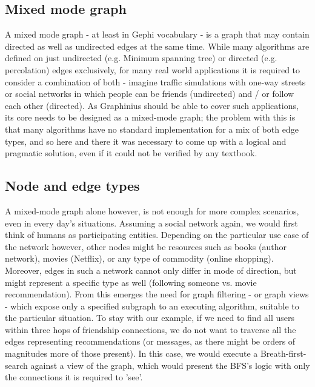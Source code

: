 	\subsection{Mixed mode graph}
	\label{ssect:mixedmode}
	A mixed mode graph - at least in Gephi vocabulary - is a graph that may contain directed as well as undirected edges at the same time. While many algorithms are defined on just undirected (e.g. Minimum spanning tree) or directed (e.g. percolation) edges exclusively, for many real world applications it is required to consider a combination of both - imagine traffic simulations with one-way streets or social networks in which people can be friends (undirected) and / or follow each other (directed). As Graphinius should be able to cover such applications, its core needs to be designed as a mixed-mode graph; the problem with this is that many algorithms have no standard implementation for a mix of both edge types, and so here and there it was necessary to come up with a logical and pragmatic solution, even if it could not be verified by any textbook.
	
	\subsection{Node and edge types}
	\label{ssect:node_types}	
	A mixed-mode graph alone however, is not enough for more complex scenarios, even in every day's situations. Assuming a social network again, we would first think of humans as participating entities. Depending on the particular use case of the network however, other nodes might be resources such as books (author network), movies (Netflix), or any type of commodity (online shopping). Moreover, edges in such a network cannot only differ in mode of direction, but might represent a specific type as well (following someone vs. movie recommendation). From this emerges the need for graph filtering - or graph views - which expose only a specified subgraph to an executing algorithm, suitable to the particular situation. To stay with our example, if we need to find all users within three hops of friendship connections, we do not want to traverse all the edges representing recommendations (or messages, as there might be orders of magnitudes more of those present). In this case, we would execute a Breath-first-search against a view of the graph, which would present the BFS's logic with only the connections it is required to 'see'.
	
	
